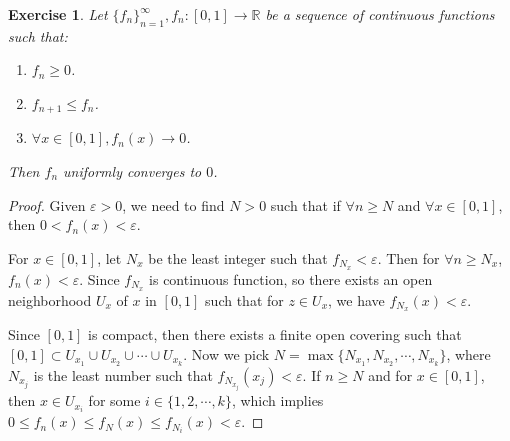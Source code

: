\documentclass[12pt,leqno]{amsart}
\newtheorem{exercise}{Exercise}[section]
\theoremstyle{definition}
\numberwithin{equation}{subsection}
\begin{document}
\begin{exercise}
Let $\{f_n\}^\infty_{n=1}, f_n:[0,1]\to\mathbb{R}$ be a sequence of continuous functions such that:
\begin{enumerate}
    \item $f_n \geq 0$.
    \item $f_{n+1}\leq f_n$.
    \item $\forall x\in [0,1], f_n(x)\to 0$.
\end{enumerate}
Then $f_n$ uniformly converges to $0$.
\end{exercise}
\begin{proof}
Given $\varepsilon > 0$, we need to find $N > 0$ such that if $\forall n \geq N$ and $\forall x\in [0,1]$, then $0 < f_n(x) < \varepsilon$.

For $x\in [0,1]$, let $N_x$ be the least integer such that $f_{N_x} < \varepsilon$. Then for $\forall n \geq N_x$, $f_n(x) < \varepsilon$. Since $f_{N_x}$ is continuous function, so there exists an open neighborhood $U_x$ of $x$ in $[0,1]$ such that for $z\in U_x$, we have $f_{N_x}(x) < \varepsilon$. 

Since $[0,1]$ is compact, then there exists a finite open covering such that $[0,1]\subset U_{x_1}\cup U_{x_2} \cup \cdots \cup U_{x_k}$. Now we pick $N = \max\{N_{x_1},N_{x_2},\cdots,N_{x_k}\}$, where $N_{x_j}$ is the least number such that $f_{N_{x_j}}(x_j) < \varepsilon$. If $n\geq N$ and for $x\in[0,1]$, then $x\in U_{x_i}$ for some $i\in\{1,2,\cdots, k\}$, which implies $0 \leq f_n(x) \leq f_N(x) \leq f_{N_i}(x) < \varepsilon$.
\end{proof}

\medskip
\end{document}
